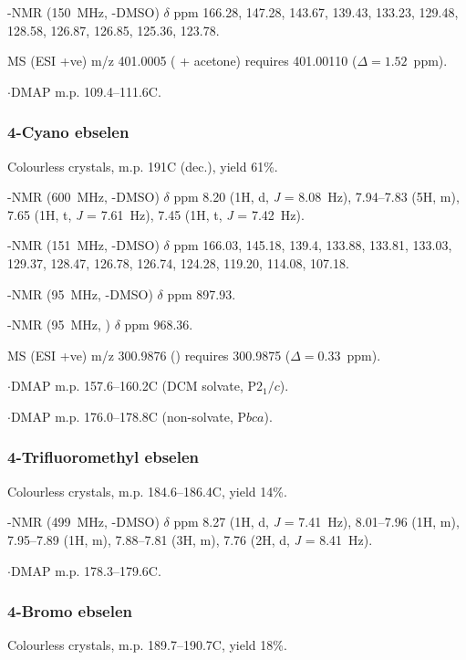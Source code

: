 \begin{refsection}
-NMR (150~MHz, -DMSO) $ \delta $ ppm 166.28, 147.28, 143.67, 139.43, 133.23, 129.48, 128.58, 126.87, 126.85, 125.36, 123.78.

MS (ESI +ve) m/z 401.0005 ( + acetone)  requires 401.00110 ($ \Delta =1.52$~ppm).

$ \cdot $DMAP m.p. 109.4--111.6\degree{}C.


\subsubsection{4-Cyano ebselen }
Colourless crystals, m.p. 191\degree{}C (dec.), yield 61\%.

-NMR (600~MHz, -DMSO) $ \delta $ ppm 8.20 (1H, d, \textit{J} = 8.08~Hz), 7.94--7.83 (5H, m), 7.65 (1H, t, \textit{J} = 7.61~Hz), 7.45 (1H, t, \textit{J} = 7.42~Hz).

-NMR (151~MHz, -DMSO) $ \delta $ ppm 166.03, 145.18, 139.4, 133.88, 133.81, 133.03, 129.37, 128.47, 126.78, 126.74, 124.28, 119.20, 114.08, 107.18.

-NMR (95~MHz, -DMSO) $ \delta $ ppm 897.93.

-NMR (95~MHz, ) $ \delta $ ppm 968.36.

MS (ESI +ve) m/z 300.9876 ()  requires 300.9875 ($ \Delta = 0.33$~ppm).

$ \cdot $DMAP m.p. 157.6--160.2\degree{}C (DCM solvate, P$2_1/c$).

$ \cdot $DMAP m.p. 176.0--178.8\degree{}C (non-solvate, P$bca$).


\subsubsection{4-Trifluoromethyl ebselen }
Colourless crystals, m.p. 184.6--186.4\degree{}C, yield 14\%.\autocite{Wan2021}

-NMR (499~MHz, -DMSO) $ \delta $ ppm 8.27 (1H, d, \textit{J} = 7.41~Hz), 8.01--7.96 (1H, m), 7.95--7.89 (1H, m), 7.88--7.81 (3H, m), 7.76 (2H, d, \textit{J} = 8.41~Hz).

$ \cdot $DMAP m.p. 178.3--179.6\degree{}C.


\subsubsection{4-Bromo ebselen } 
Colourless crystals, m.p. 189.7--190.7\degree{}C, yield 18\%.\autocite{Pacua2014}


\end{refsection}
